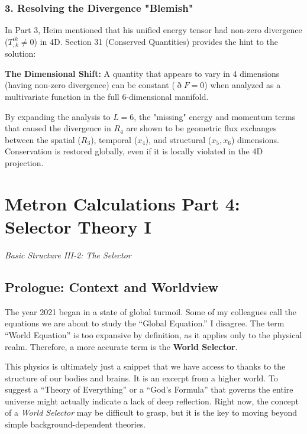 \documentclass[11pt,a4paper,oneside]{article}
\begin{document}
\subsubsection*{3. Resolving the Divergence "Blemish"}
In Part 3, Heim mentioned that his unified energy tensor had non-zero divergence ($T^{ik}_{;k} \neq 0$) in 4D. Section 31 (Conserved Quantities) provides the hint to the solution:
\begin{mbbcite}
    \textbf{The Dimensional Shift:} A quantity that appears to vary in 4 dimensions (having non-zero divergence) can be constant ($\eth F = 0$) when analyzed as a multivariate function in the full 6-dimensional manifold. 
\end{mbbcite}
By expanding the analysis to $L=6$, the "missing" energy and momentum terms that caused the divergence in $R_4$ are shown to be geometric flux exchanges between the spatial ($R_3$), temporal ($x_4$), and structural ($x_5, x_6$) dimensions. Conservation is restored globally, even if it is locally violated in the 4D projection. 
\section{Metron Calculations Part 4: Selector Theory I}
\textit{Basic Structure III-2: The Selector}

\subsection{Prologue: Context and Worldview}

The year 2021 began in a state of global turmoil. Some of my colleagues call the equations we are about to study the ``Global Equation.'' I disagree. The term ``World Equation'' is too expansive by definition, as it applies only to the physical realm. Therefore, a more accurate term is the \textbf{World Selector}.

This physics is ultimately just a snippet that we have access to thanks to the structure of our bodies and brains. It is an excerpt from a higher world. To suggest a ``Theory of Everything'' or a ``God’s Formula'' that governs the entire universe might actually indicate a lack of deep reflection. Right now, the concept of a \textit{World Selector} may be difficult to grasp, but it is the key to moving beyond simple background-dependent theories.
\end{document}
